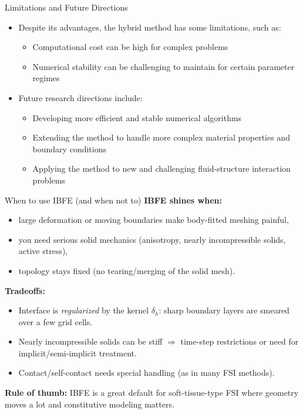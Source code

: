 \documentclass{beamer}
\begin{document}
\begin{frame}{Limitations and Future Directions}
    \begin{itemize}
        \item Despite its advantages, the hybrid method has some limitations, such as:
        \begin{itemize}
            \item Computational cost can be high for complex problems
            \item Numerical stability can be challenging to maintain for certain parameter regimes
        \end{itemize}
        \item Future research directions include:
        \begin{itemize}
            \item Developing more efficient and stable numerical algorithms
            \item Extending the method to handle more complex material properties and boundary conditions
            \item Applying the method to new and challenging fluid-structure interaction problems
        \end{itemize}
    \end{itemize}
\end{frame}

\begin{frame}{When to use IBFE (and when not to)}
\small
\textbf{IBFE shines when:}
\begin{itemize}
  \item large deformation or moving boundaries make body-fitted meshing painful,
  \item you need serious solid mechanics (anisotropy, nearly incompressible solids, active stress),
  \item topology stays fixed (no tearing/merging of the solid mesh).
\end{itemize}

\medskip
\textbf{Tradeoffs:}
\begin{itemize}
  \item Interface is \emph{regularized} by the kernel \(\delta_h\): sharp boundary layers are smeared over a few grid cells.
  \item Nearly incompressible solids can be stiff \(\Rightarrow\) time-step restrictions or need for implicit/semi-implicit treatment.
  \item Contact/self-contact needs special handling (as in many FSI methods).
\end{itemize}

\medskip
\textbf{Rule of thumb:}
IBFE is a great default for soft-tissue-type FSI where geometry moves a lot and constitutive modeling matters.
\end{frame}
\end{document}
